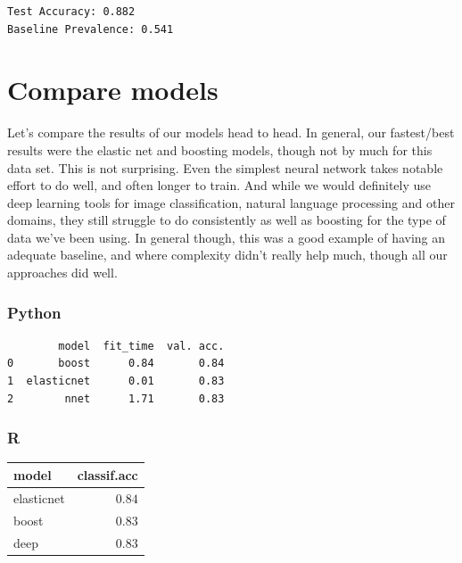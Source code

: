 \documentclass[
  letterpaper,
]{krantz}
\newenvironment{Shaded}{}{}
\newcommand{\CommentTok}[1]{\textcolor[rgb]{0.38,0.63,0.69}{\textit{#1}}}
\newcommand{\FunctionTok}[1]{\textcolor[rgb]{0.02,0.16,0.49}{#1}}
\newcommand{\NormalTok}[1]{#1}
\newcommand{\OtherTok}[1]{\textcolor[rgb]{0.00,0.44,0.13}{#1}}
\newcommand{\SpecialCharTok}[1]{\textcolor[rgb]{0.25,0.44,0.63}{#1}}
\newcommand{\StringTok}[1]{\textcolor[rgb]{0.25,0.44,0.63}{#1}}
\begin{document}
\begin{Shaded}
\end{Shaded}

\begin{verbatim}
Test Accuracy: 0.882
Baseline Prevalence: 0.541
\end{verbatim}

\section{Compare models}\label{compare-models}

Let's compare the results of our models head to head. In general, our
fastest/best results were the elastic net and boosting models, though
not by much for this data set. This is not surprising. Even the simplest
neural network takes notable effort to do well, and often longer to
train. And while we would definitely use deep learning tools for image
classification, natural language processing and other domains, they
still struggle to do consistently as well as boosting for the type of
data we've been using. In general though, this was a good example of
having an adequate baseline, and where complexity didn't really help
much, though all our approaches did well.

\subsubsection{Python}

\begin{verbatim}
        model  fit_time  val. acc.
0       boost      0.84       0.84
1  elasticnet      0.01       0.83
2        nnet      1.71       0.83
\end{verbatim}

\subsubsection{R}

\begin{longtable*}{lr}
\toprule
model & classif.acc \\ 
\midrule
elasticnet & $0.84$ \\ 
boost & $0.83$ \\ 
deep & $0.83$ \\ 
\bottomrule
\end{longtable*}
\end{document}
